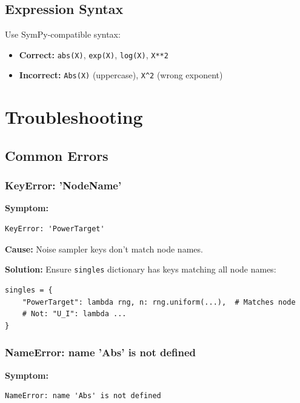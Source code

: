 \documentclass[11pt,a4paper]{article}
\begin{document}
\subsection{Expression Syntax}

Use SymPy-compatible syntax:
\begin{itemize}
    \item \textbf{Correct:} \texttt{abs(X)}, \texttt{exp(X)}, \texttt{log(X)}, \texttt{X**2}
    \item \textbf{Incorrect:} \texttt{Abs(X)} (uppercase), \texttt{X\^{}2} (wrong exponent)
\end{itemize}

\section{Troubleshooting}

\subsection{Common Errors}

\subsubsection{KeyError: 'NodeName'}

\textbf{Symptom:}
\begin{verbatim}
KeyError: 'PowerTarget'
\end{verbatim}

\textbf{Cause:} Noise sampler keys don't match node names.

\textbf{Solution:} Ensure \texttt{singles} dictionary has keys matching all node names:
\begin{lstlisting}
singles = {
    "PowerTarget": lambda rng, n: rng.uniform(...),  # Matches node
    # Not: "U_I": lambda ...
}
\end{lstlisting}

\subsubsection{NameError: name 'Abs' is not defined}

\textbf{Symptom:}
\begin{verbatim}
NameError: name 'Abs' is not defined
\end{verbatim}
\end{document}
